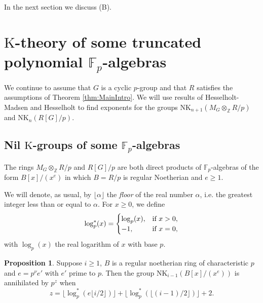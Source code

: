 \documentclass[reqno,11pt,letterpaper]{amsart}
\theoremstyle{plain}
\numberwithin{equation}{subsection}
\newtheorem{proposition}[equation]{Proposition}
\theoremstyle{remark}
\theoremstyle{plain}
\theoremstyle{definition}\newtheorem*{notation}{Notation}
\newtheorem{proposition}[theorem]{Proposition}
\newcommand{\RK}{\mathrm{K}}
\newcommand{\RNK}{\mathrm{NK}}
\newcommand{\BZ}{\mathbb{Z}}
\begin{document}
  
    In the next section we discuss (B). 


 

\section{$\RK$-theory of some truncated polynomial ${\mathbb F}_p$-algebras}\label{s:truncated}



We continue to assume that $G$ is a cyclic $p$-group and that $R$ satisfies the assumptions of Theorem \ref{thm:MainIntro}. We will use results of Hesselholt-Madsen \cite{HesseMad} and Hesselholt \cite{HesseHandbook} to find  exponents for the groups 
$\RNK_{n+1}(M_G\otimes_\BZ R/p)$ and $\RNK_n(R[G]/p)$.

 

\subsection{Nil $\RK$-groups of some ${\mathbb F}_p$-algebras}
The rings $M_G\otimes_\BZ R/p$ and $R[G]/p$ are both direct products of ${\mathbb F}_p$-algebras of the form $B[x]/(x^e)$ in which $B=R/p$ is regular Noetherian  and  $e\geq 1$.   

We will denote, as usual, by $\lfloor \alpha \rfloor$ the \emph{floor} of the real number $\alpha$, i.e. the greatest integer less than or equal to $\alpha$. 
For $x\geq 0$, we define 
\[
\log^*_p(x)=\begin{cases} \log_p(x), & \hbox{\rm if}\ x>0,\\ -1, &\hbox{\rm if}\ x=0,
\end{cases}
\]
with $\log_p(x)$ the real logarithm of $x$ with base $p$.
 
\begin{proposition}\label{lem:dumbbound}  Suppose $i \ge 1$, $B$ is a regular noetherian ring of characteristic $p$  and $e = p^\nu e'$ with $e'$ prime to $p$.  Then the group $\RNK_{i-1}(B[x]/(x^e) )$ is annihilated by $p^z$ when 
\begin{equation}
\label{eq:zdef}
z = \lfloor \log^*_p(e\lfloor i/2\rfloor ) \rfloor  + \lfloor \log^*_p(\lfloor (i-1)/2\rfloor) \rfloor + 2.
\end{equation}  
\end{proposition}
\end{document}
